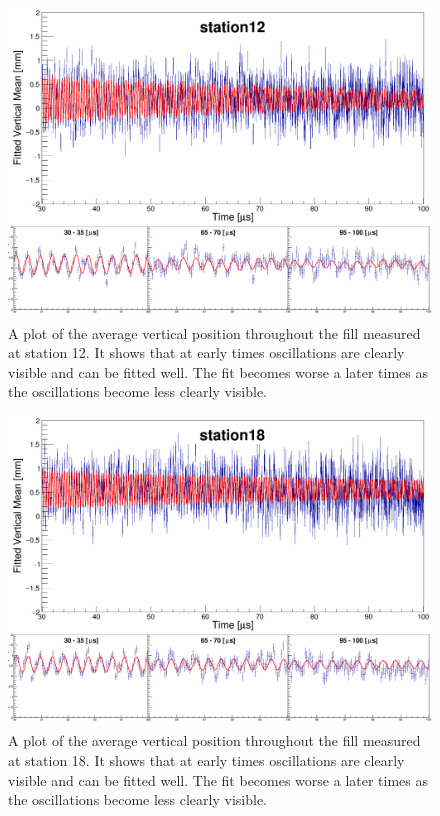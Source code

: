 \begin{figure}[!h]
\centering 
\includegraphics[scale=0.25]{Figures/AverageVerticalPosition_exponentialFit_station12.png}
\decoRule
\caption{A plot of the average vertical position throughout the fill measured at station 12. It shows that at early times oscillations are clearly visible and can be fitted well. The fit becomes worse a later times as the oscillations become less clearly visible.}
\label{fig:AverageVerticalPosition_exponentialFit_station12.png}
\end{figure}

\begin{figure}[!h]
\centering 
\includegraphics[scale=0.25]{Figures/AverageVerticalPosition_exponentialFit_station18.png}
\decoRule
\caption{A plot of the average vertical position throughout the fill measured at station 18. It shows that at early times oscillations are clearly visible and can be fitted well. The fit becomes worse a later times as the oscillations become less clearly visible.}
\label{fig:AverageVerticalPosition_exponentialFit_station18.png}
\end{figure}

